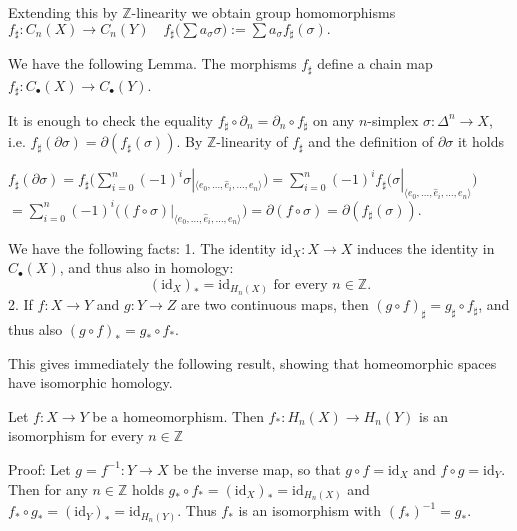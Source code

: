 Extending this by \(\mathbb{Z}\)-linearity we obtain group homomorphisms 
\(f_\sharp: C_n(X) \to C_n(Y) \quad f_\sharp \big(\sum a_\sigma \sigma \big) := \sum a_\sigma f_\sharp (\sigma).\)

We have the following Lemma. The morphisms \(f_\sharp\) define a chain map \(f_\sharp: C_\bullet(X) \to C_\bullet(Y)\).

It is enough to check the equality \(f_\sharp \circ \partial_n = \partial_n \circ f_\sharp\) on any \(n\)-simplex \(\sigma: \Delta^n \to X\), i.e. \(f_\sharp (\partial \sigma) = \partial (f_\sharp (\sigma))\). By \(\mathbb{Z}\)-linearity of \(f_\sharp\) and the definition of \(\partial \sigma\) it holds

\(f_\sharp (\partial \sigma) = f_\sharp \big( \sum_{i=0}^n (-1)^i \sigma |_{\langle e_0, \dots, \hat{e}_i, \dots, e_n \rangle} \big) = \sum_{i=0}^n (-1)^i f_\sharp \big( \sigma |_{\langle e_0, \dots, \hat{e}_i, \dots, e_n \rangle} \big) \)
\(= \sum_{i=0}^n (-1)^i \big( (f \circ \sigma) |_{\langle e_0, \dots, \hat{e}_i, \dots, e_n \rangle} \big)  = \partial (f \circ \sigma) = \partial (f_\sharp (\sigma)). \)

We have the following facts:
1. The identity \(\text{id}_X : X \to X\) induces the identity in \(C_\bullet(X)\), and thus also in homology: 
\[(\text{id}_X)_* = \text{id}_{H_n(X)} \text{ for every } n \in \mathbb{Z}.\] 
2. If \(f: X \to Y\) and \(g: Y \to Z\) are two continuous maps, then \((g \circ f)_\sharp = g_\sharp \circ f_\sharp\), and thus also \((g \circ f)_* = g_* \circ f_*\).

This gives immediately the following result, showing that homeomorphic spaces have isomorphic homology.

Let \(f : X \to Y\) be a homeomorphism. Then \(f_* : H_n(X) \to H_n(Y)\) is an isomorphism for every \(n \in \mathbb{Z}\)

Proof: Let \(g = f^{-1} : Y \to X\) be the inverse map, so that \(g \circ f = \text{id}_X\) and \(f \circ g = \text{id}_Y\). Then for any \(n \in \mathbb{Z}\) holds \(g_* \circ f_* = (\text{id}_X)_* = \text{id}_{H_n(X)}\) and \(f_* \circ g_* = (\text{id}_Y)_* = \text{id}_{H_n(Y)}\). Thus \(f_*\) is an isomorphism with \((f_*)^{-1} = g_*\).
